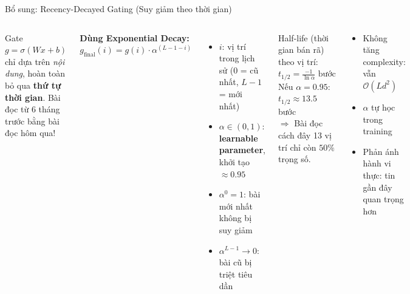 \documentclass[aspectratio=169,11pt]{beamer}
\newcommand{\faCheckCircle}{$\checkmark$}
\begin{document}
\begin{frame}{Bổ sung: Recency-Decayed Gating (Suy giảm theo thời gian)}
  \begin{columns}[T]
      \begin{warnbox}[title={Hạn chế của NRAGLS gốc}]
      \small
        Gate $g = \sigma(Wx+b)$ chỉ dựa trên \textit{nội dung},
        hoàn toàn bỏ qua \textbf{thứ tự thời gian}.
        Bài đọc từ 6 tháng trước bằng bài đọc hôm qua!
      \end{warnbox}

      \vspace{0.1em}
      \textbf{Dùng Exponential Decay:}
      $
        g_{\text{final}}(i) = g(i) \cdot \alpha^{(L-1-i)}
      $
      \begin{itemize}
        \item $i$: vị trí trong lịch sử (0 = cũ nhất, $L{-}1$ = mới nhất)
        \item $\alpha \in (0,1)$: \textbf{learnable parameter}, khởi tạo $\approx 0.95$
        \item $\alpha^0=1$: bài mới nhất không bị suy giảm
        \item $\alpha^{L-1}\to 0$: bài cũ bị triệt tiêu dần
      \end{itemize}

      \begin{keybox}[title={Phân tích Half-life}]
        \footnotesize
        Half-life (thời gian bán rã) theo vị trí:
        $
          t_{1/2} = \frac{-1}{\ln\alpha} \text{ bước}
        $\\
        Nếu $\alpha=0.95$: $t_{1/2} \approx 13.5$ bước\\[0.3em]
        $\Rightarrow$ Bài đọc cách đây 13 vị trí
        chỉ còn $50\%$ trọng số.
      \end{keybox}
      \vspace{0.2em}
      \begin{goodbox}[title={\faCheckCircle\ Ưu điểm}]
        \footnotesize
        \begin{itemize}
          \item Không tăng complexity: vẫn $\mathcal{O}(Ld^2)$
          \item $\alpha$ tự học trong training
          \item Phản ánh hành vi thực: tin gần đây quan trọng hơn
        \end{itemize}
      \end{goodbox}
  \end{columns}
\end{frame}
\end{document}
